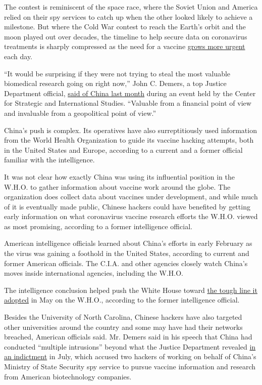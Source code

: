 The contest is reminiscent of the space race, where the Soviet Union and
America relied on their spy services to catch up when the other looked
likely to achieve a milestone. But where the Cold War contest to reach
the Earth's orbit and the moon played out over decades, the timeline to
help secure data on coronavirus treatments is sharply compressed as the
need for a vaccine
\href{https://www.nytimes3xbfgragh.onion/2020/05/02/us/politics/vaccines-coronavirus-research.html}{grows
more urgent} each day.

``It would be surprising if they were not trying to steal the most
valuable biomedical research going on right now,'' John C. Demers, a top
Justice Department official,
\href{https://www.csis.org/events/online-event-countering-chinese-espionage}{said
of China last month} during an event held by the Center for Strategic
and International Studies. ``Valuable from a financial point of view and
invaluable from a geopolitical point of view.''

China's push is complex. Its operatives have also surreptitiously used
information from the World Health Organization to guide its vaccine
hacking attempts, both in the United States and Europe, according to a
current and a former official familiar with the intelligence.

It was not clear how exactly China was using its influential position in
the W.H.O. to gather information about vaccine work around the globe.
The organization does collect data about vaccines under development, and
while much of it is eventually made public, Chinese hackers could have
benefited by getting early information on what coronavirus vaccine
research efforts the W.H.O. viewed as most promising, according to a
former intelligence official.

American intelligence officials learned about China's efforts in early
February as the virus was gaining a foothold in the United States,
according to current and former American officials. The C.I.A. and other
agencies closely watch China's moves inside international agencies,
including the W.H.O.

The intelligence conclusion helped push the White House toward
\href{https://www.nytimes3xbfgragh.onion/2020/05/19/us/politics/trump-who-coronavirus.html}{the
tough line it adopted} in May on the W.H.O., according to the former
intelligence official.

Besides the University of North Carolina, Chinese hackers have also
targeted other universities around the country and some may have had
their networks breached, American officials said. Mr. Demers said in his
speech that China had conducted ``multiple intrusions'' beyond what the
Justice Department revealed
\href{https://www.nytimes3xbfgragh.onion/2020/07/21/us/politics/china-hacking-coronavirus-vaccine.html}{in
an indictment} in July, which accused two hackers of working on behalf
of China's Ministry of State Security spy service to pursue vaccine
information and research from American biotechnology companies.

